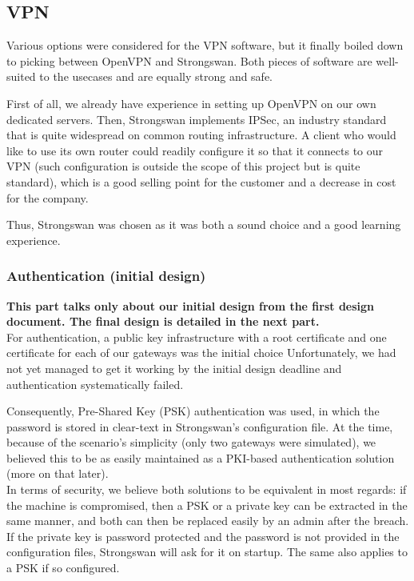 \documentclass[paper=a4, fontsize=11pt]{scrartcl}
\begin{document}
\subsection{VPN}

Various options were considered for the VPN software, but it finally boiled down
to picking between OpenVPN and Strongswan.
Both pieces of software are well-suited to the usecases and are equally
strong and safe.

First of all, we already have experience in setting up OpenVPN on our own
dedicated servers.
Then, Strongswan implements IPSec, an industry standard that is quite widespread
on common routing infrastructure.
A client who would like to use its own router could readily configure
it so that it connects to our VPN (such configuration is outside the
scope of this project but is quite standard), which is a good selling point for
the customer and a decrease in cost for the company.

Thus, Strongswan was chosen as it was both a sound choice and a good learning
experience.

\subsubsection{Authentication (initial design)}
\textbf{%
\huge \danger{} \normalsize
This part talks only about our initial design from the first design document.
The final design is detailed in the next part.
}
\\

For authentication, a public key infrastructure with a root certificate and one
certificate for each of our gateways was the initial choice
Unfortunately, we had not yet managed to get it working by the initial design
deadline and authentication systematically failed.

Consequently, Pre-Shared Key (PSK) authentication was used, in which the
password is stored in clear-text in Strongswan's configuration file.
At the time, because of the scenario's simplicity (only two gateways were
simulated), we believed this to be as easily maintained as a
PKI-based authentication solution (more on that later).\\

In terms of security, we believe both solutions to be equivalent in most
regards: if the machine is compromised, then a PSK or a private key can be
extracted in the same manner, and both can then be replaced easily by an admin
after the breach. 
If the private key is password protected and the password is not provided in the
configuration files, Strongswan will ask for it on startup.
The same also applies to a PSK if so configured.
\end{document}
